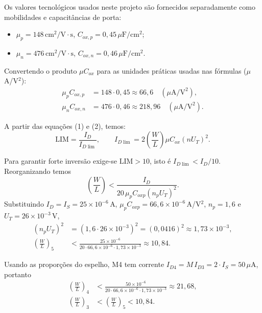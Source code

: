 \documentclass[12pt,a4paper]{article}
\begin{document}
Os valores tecnológicos usados neste projeto são fornecidos separadamente como mobilidades e capacitâncias de porta:
\begin{center}
\begin{minipage}{0.55\textwidth}
\begin{itemize}
    \item $\mu_p = 148\,\text{cm}^2/\text{V}\cdot\text{s}$, \quad $C_{ox,p}=0{,}45\,\mu\text{F}/\text{cm}^2$;
    \item $\mu_n = 476\,\text{cm}^2/\text{V}\cdot\text{s}$, \quad $C_{ox,n}=0{,}46\,\mu\text{F}/\text{cm}^2$.
\end{itemize}
\end{minipage}
\end{center}
Convertendo o produto $\mu C_{ox}$ para as unidades práticas usadas nas fórmulas ($\mu$A/V$^2$):
\begin{align*}
\mu_p C_{ox,p} &= 148\cdot 0{,}45 \approx 66{,}6\quad (\mu\text{A}/\text{V}^2),\\
\mu_n C_{ox,n} &= 476\cdot 0{,}46 \approx 218{,}96\quad (\mu\text{A}/\text{V}^2).
\end{align*}


A partir das equações (1) e (2), temos:
\begin{equation}
\mathrm{LIM} = \frac{I_D}{I_{D\lim}},\qquad I_{D\lim} = 2\left(\frac{W}{L}\right)\mu C_{ox}(nU_T)^2.
\end{equation}

Para garantir forte inversão exige-se $\mathrm{LIM}>10$, isto é $I_{D\lim}<I_D/10$. Reorganizando temos
\begin{equation}\label{eq:pmos-lim2}
\left(\frac{W}{L}\right) < \frac{I_D}{20\,\mu_p C_{ox p}(n_p U_T)^2}.
\end{equation}
Substituindo $I_D=I_S=25\times10^{-6}\,$A, $\mu_p C_{ox p}=66{,}6\times10^{-6}\,$A/V$^2$, $n_p=1{,}6$ e $U_T=26\times10^{-3}\,$V,
\begin{align*}
(n_p U_T)^2 &= (1{,}6\cdot 26\times10^{-3})^2 = (0{,}0416)^2\approx 1{,}73\times10^{-3},\\
\left(\frac{W}{L}\right)_5 &< \frac{25\times10^{-6}}{20\cdot 66{,}6\times10^{-6}\cdot 1{,}73\times10^{-3}} \approx \boxed{10{,}84}.
\end{align*}

Usando as proporções do espelho, M4 tem corrente $I_{D4}=M\,I_{D3}=2\cdot I_S = 50\,\mu$A, portanto
\begin{align*}
\left(\frac{W}{L}\right)_4 &< \frac{50\times10^{-6}}{20\cdot 66{,}6\times10^{-6}\cdot 1{,}73\times10^{-3}} \approx \boxed{21{,}68},\\
\left(\frac{W}{L}\right)_3 &< \left(\frac{W}{L}\right)_5 < 10{,}84.
\end{align*}
\end{document}
